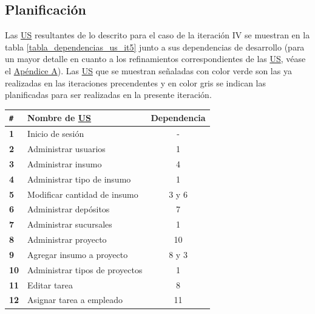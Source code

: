 \documentclass[a4paper, 12pt,twoside]{report}  %
\numberwithin{equation}{subsection} %
\begin{document}
\subsection{Planificación}
Las \hyperlink{US}{US} resultantes de lo descrito para el caso de la iteración IV se muestran en la tabla \ref{tabla_dependencias_us_it5} junto a sus dependencias de desarrollo (para un mayor detalle en cuanto a los refinamientos correspondientes de las \hyperlink{US}{US}, véase el \hyperlink{apendice_a}{Apéndice A}). Las \hyperlink{US}{US} que se muestran señaladas con color verde son las ya realizadas en las iteraciones precendentes y en color gris se indican las planificadas para ser realizadas en la presente iteración.

\begin{table}[h!]
	\centering
	\begin{tabular}{ |p{0.5cm}|p{9cm}|c|  }
		\hline
		\verb|#|& \textbf{Nombre de \hyperlink{US}{US}}& \textbf{Dependencia} \\
		\hline
		\textbf{1} & \cellcolor{marca_US_realizada_anterior}Inicio de sesión & - \\
		\hline
		\textbf{2} & \cellcolor{marca_US_realizada_anterior}Administrar usuarios & 1 \\
		\hline
		\textbf{3} & \cellcolor{marca_US_realizada_anterior}Administrar insumo & 4 \\
		\hline
		\textbf{4} & \cellcolor{marca_US_realizada_anterior}Administrar tipo de insumo & 1 \\
		\hline
		\textbf{5} & \cellcolor{marca_US_realizada_anterior}Modificar cantidad de insumo & 3 y 6 \\
		\hline
		\textbf{6} & \cellcolor{marca_US_realizada_anterior}Administrar depósitos & 7 \\
		\hline
		\textbf{7} & \cellcolor{marca_US_realizada_anterior}Administrar sucursales & 1 \\
		\hline
		\textbf{8} & \cellcolor{marca_US_realizada_anterior}Administrar proyecto & 10 \\
		\hline
		\textbf{9} & \cellcolor{marca_US_realizada_anterior}Agregar insumo a proyecto & 8 y 3 \\
		\hline
		\textbf{10} & \cellcolor{marca_US_realizada_anterior}Administrar tipos de proyectos & 1 \\
		\hline
		\textbf{11} & \cellcolor{marca_US_realizada_anterior}Editar tarea & 8 \\
		\hline
		\textbf{12} & \cellcolor{marca_US_realizada_anterior}Asignar tarea a empleado & 11\\

\end{tabular}
\end{table}
\end{document}
